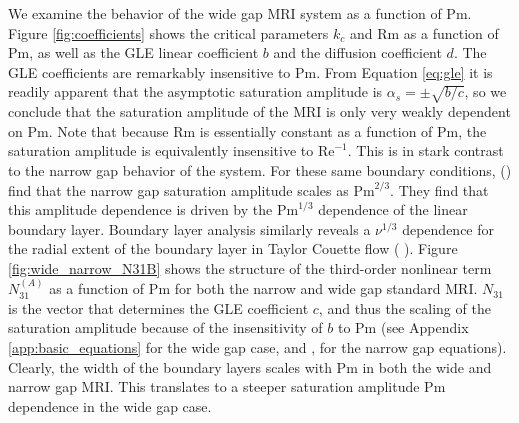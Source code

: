 \documentclass{emulateapj}
\newcommand{\citei}[1]{\citeauthor{#1} \citeyear{#1}}
\newcommand\reye{\mathrm{Re}}
\newcommand\reym{\mathrm{Rm}}
\newcommand{\Pm}{\mathrm{Pm}}
\begin{document}
We examine the behavior of the wide gap MRI system as a function of $\Pm$. Figure \ref{fig:coefficients} shows the critical parameters $k_c$ and $\reym$ as a function of $\Pm$, as well as the GLE linear coefficient $b$ and the diffusion coefficient $d$. The GLE coefficients are remarkably insensitive to $\Pm$. From Equation \ref{eq:gle} it is readily apparent that the asymptotic saturation amplitude is $\alpha_{s} = \pm \sqrt{b/c}$, so we conclude that the saturation amplitude of the MRI is only very weakly dependent on $\Pm$. Note that because $\reym$ is essentially constant as a function of $\Pm$, the saturation amplitude is equivalently insensitive to $\reye^{-1}$. This is in stark contrast to the narrow gap behavior of the system. For these same boundary conditions, \citeauthor{Umurhan:2007hs} (\citeyear{Umurhan:2007hs}) find that the narrow gap saturation amplitude scales as $\Pm^{2/3}$. They find that this amplitude dependence is driven by the $\Pm^{1/3}$ dependence of the linear boundary layer. Boundary layer analysis similarly reveals a $\nu^{1/3}$ dependence for the radial extent of the boundary layer in Taylor Couette flow (\citei{Goodman:2002ix}). %
Figure \ref{fig:wide_narrow_N31B} shows the structure of the third-order nonlinear term $N_{31}^{(A)}$ as a function of $\Pm$ for both the narrow and wide gap standard MRI. $N_{31}$ is the vector that determines the GLE coefficient $c$, and thus the scaling of the saturation amplitude because of the insensitivity of $b$ to $\Pm$ (see Appendix \ref{app:basic_equations} for the wide gap case, and \citei{Umurhan:2007hs}, \citei{Clark:2016} for the narrow gap equations). Clearly, the width of the boundary layers scales with $\Pm$ in both the wide and narrow gap MRI. This translates to a steeper saturation amplitude $\Pm$ dependence in the wide gap case.%

\end{document}
